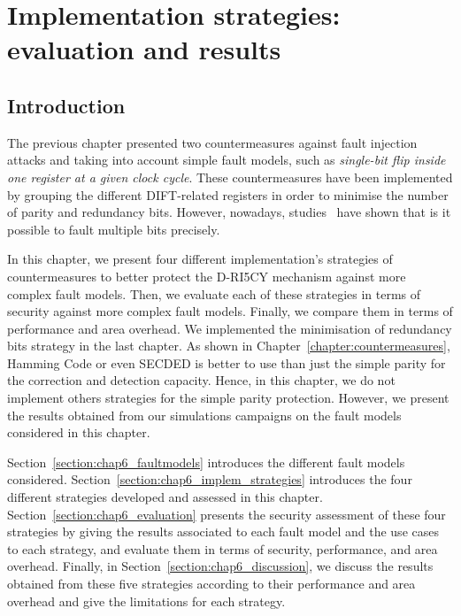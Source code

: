 \chapter{Implementation strategies: evaluation and results}
\label{chapter:exp_setup_results}
\minitoc

\section{Introduction}
The previous chapter presented two countermeasures against fault injection attacks and taking into account simple fault models, such as \textit{single-bit flip inside one register at a given clock cycle}. These countermeasures have been implemented by grouping the different DIFT-related registers in order to minimise the number of parity and redundancy bits. However, nowadays, studies~\cite{CGVCBLC-22-cardis,VDSPB-24-jce} have shown that is it possible to fault multiple bits precisely.

In this chapter, we present four different implementation's strategies of countermeasures to better protect the D-RI5CY mechanism against more complex fault models. Then, we evaluate each of these strategies in terms of security against more complex fault models. Finally, we compare them in terms of performance and area overhead. We implemented the minimisation of redundancy bits strategy in the last chapter. As shown in Chapter~\ref{chapter:countermeasures}, Hamming Code or even SECDED is better to use than just the simple parity for the correction and detection capacity. Hence, in this chapter, we do not implement others strategies for the simple parity protection. However, we present the results obtained from our simulations campaigns on the fault models considered in this chapter.

Section~\ref{section:chap6_faultmodels} introduces the different fault models considered.
Section~\ref{section:chap6_implem_strategies} introduces the four different strategies developed and assessed in this chapter.
Section~\ref{section:chap6_evaluation} presents the security assessment of these four strategies by giving the results associated to each fault model and the use cases to each strategy, and evaluate them in terms of security, performance, and area overhead.
Finally, in Section~\ref{section:chap6_discussion}, we discuss the results obtained from these five strategies according to their performance and area overhead and give the limitations for each strategy.

